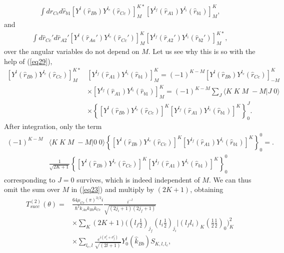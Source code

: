 \begin{equation}\label{eq29}
 \begin{split}
\int d \hat r_{Cc}d \hat r_{b1} \left[Y^{l} (\hat r_{Bb}) Y ^{l_c} (\hat r_{Cc}) \right]^{K*}_{M}
\left[ Y ^{l_f} (\hat r_{A1}) Y ^{l_i} (\hat r_{b1}) \right] _{M}^{K},
 \end{split}
\end{equation}
and
\begin{equation}\label{eq30}
 \begin{split}
\int d \hat r_{Cc}'d \hat r_{A2}' \left[Y^{l} (\hat r_{Aa}') Y ^{l_c} (\hat r_{Cc}') \right]^{K}_{M}
\left[ Y ^{l_f} (\hat r_{A2}') Y ^{l_i} (\hat r_{b2}') \right] _{M}^{K*},
 \end{split}
\end{equation}
over the angular variables do not depend on $M$. Let us see why this is so with the help of (\ref{eq29}),
\begin{equation}\label{eq31}
 \begin{split}
\left[Y^{l}(\hat r_{Bb}) Y ^{l_c} (\hat r_{Cc}) \right]^{K*}_{M}&
\left[ Y ^{l_f}  (\hat r_{A1}) Y ^{l_i} (\hat r_{b1}) \right] _{M}^{K}=
 (-1)^{K-M}\left[Y^{l} (\hat r_{Bb}) Y ^{l_c} (\hat r_{Cc}) \right]^{K}_{-M} \\
& \times \left[ Y ^{l_f} (\hat r_{A1}) Y ^{l_i} (\hat r_{b1}) \right] _{M}^{K}=(-1)^{K-M} \sum_J \langle K\;K\;M\;-M|J\;0\rangle \\
& \times \left\lbrace \left[Y^{l} (\hat r_{Bb}) Y ^{l_c} (\hat r_{Cc}) \right]^{K}
\left[ Y ^{l_f} (\hat r_{A1}) Y ^{l_i} (\hat r_{b1}) \right]^{K} \right\rbrace ^J_0.
\end{split}
\end{equation}
After integration, only the term
\begin{equation}\label{eq32}
 \begin{split}
(-1)^{K-M} & \langle K\;K\;M\;-M|0\;0\rangle \left\lbrace \left[Y^{l} (\hat r_{Bb}) Y ^{l_c} (\hat r_{Cc}) \right]^{K}
\left[ Y ^{l_f} (\hat r_{A1}) Y ^{l_i} (\hat r_{b1}) \right]^{K} \right\rbrace ^0_0=.\\
&\frac{1}{\sqrt{2K+1}} \left\lbrace \left[Y^{l} (\hat r_{Bb}) Y ^{l_c} (\hat r_{Cc}) \right]^{K}
\left[ Y ^{l_f} (\hat r_{A1}) Y ^{l_i} (\hat r_{b1}) \right]^{K} \right\rbrace ^0_0
\end{split}
\end{equation}
corresponding to $J=0$ survives, which is indeed independent of $M$.
We can thus omit the sum over $M$ in (\ref{eq23}) and multiply by $(2K+1)$, obtaining
\begin{equation}\label{eq27}
 \begin{split}
T_{succ}^{(2)}(\theta)=&\frac{64\mu_{Cc}(\pi)^{3/2} i}{\hbar^2 k_{Aa}k_{Bb}k_{Cc}}\frac{i^{-l}}{\sqrt{(2j_i+1)(2j_f+1)}}\\
&\times \sum_{K}(2K+1)
\bigl ( (l_f \tfrac{1}{2})_{j_f} (l_i \tfrac{1}{2})_{j_i} |(l_f l_i)_K (\tfrac{1}{2} \tfrac{1}{2})_0 \bigr )_K ^2\\
&\times \sum_{l_c,l}\frac{e^{i(\sigma _i^l+\sigma _f^{l})}}{\sqrt{(2l+1)}} Y_0^l (\hat k_{Bb})S_{K,l,l_c},
 \end{split}
\end{equation}
